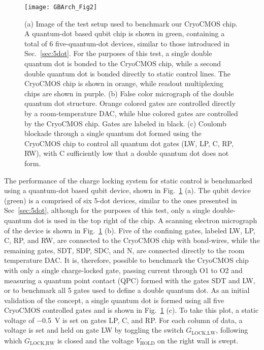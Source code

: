 \begin{figure}
  \texttt{[image: GBArch\_Fig2]}
  \caption[Testbench for the CryoCMOS architecture]
  {\label{fig:gbtb}(a) Image of the test setup used to benchmark our CryoCMOS chip. A quantum-dot based qubit chip is shown in green, containing a total of 6 five-quantum-dot devices, similar to those introduced in Sec.~\ref{sec:5dot}. For the purposes of this test, a single double quantum dot is bonded to the CryoCMOS chip, while a second double quantum dot is bonded directly to static control lines. The CryoCMOS chip is shown in orange, while readout multiplexing chips are shown in purple. (b) False color micrograph of the double quantum dot structure. Orange colored gates are controlled directly by a room-temperature DAC, while blue colored gates are controlled by the CryoCMOS chip. Gates are labeled in black. (c) Coulomb blockade through a single quantum dot formed using the CryoCMOS chip to control all quantum dot gates (LW, LP, C, RP, RW), with C sufficiently low that a double quantum dot does not form.}
\end{figure}

The performance of the charge locking system for static control is benchmarked using a quantum-dot based qubit device, shown in Fig.~\ref{fig:gbtb} (a).
The qubit device (green) is a comprised of six 5-dot devices, similar to the ones presented in Sec~\ref{sec:5dot}, although for the purposes of this test, only a single double-quantum dot is used in the top right of the chip. A scanning electron micrograph of the device is shown in Fig.~\ref{fig:gbtb} (b).
Five of the confining gates, labeled LW, LP, C, RP, and RW, are connected to the CryoCMOS chip with bond-wires, while the remaining gates, SDT, SDP, SDC, and N, are connected directly to the room temperature DAC. It is, therefore, possible to benchmark the CryoCMOS chip with only a single charge-locked gate, passing current through O1 to O2 and measuring a quantum point contact (QPC) formed with the gates SDT and LW, or to benchmark all 5 gates used to define a double quantum dot. As an initial validation of the concept, a single quantum dot is formed using all five CryoCMOS controlled gates and is shown in Fig.~\ref{fig:gbtb} (c). To take this plot, a static voltage of \SI{-0.5}{\volt} is set on gates LP, C, and RP. For each column of data, a voltage is
set and held on gate LW by toggling the switch $G_\textrm{LOCK,LW}$, following which $G_\textrm{LOCK,RW}$ is closed and the voltage $V_\textrm{HOLD}$ on the right wall is swept.

